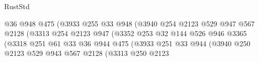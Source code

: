 \begin{lexlean}{RustStd}
\begin{coremodule}
                                            @36
                                            @948
                                            @475
                                            (@3933
                                              @255
                                              @33
                                              @948
                                              (@3940
                                                @254
                                                @2123
                                                @529
                                                @947
                                                @567
                                                @2128
                                                (@3313
                                                  @254
                                                  @2123
                                                  @947
                                                  (@3352
                                                    @253
                                                    @32
                                                    @144
                                                    @526
                                                    @946
                                                    @3365
                                                    (@3318
                                                      @251
                                                      @61
                                                      @33
                                                      @36
                                                      @944
                                                      @475
                                                      (@3933
                                                        @251
                                                        @33
                                                        @944
                                                        (@3940
                                                          @250
                                                          @2123
                                                          @529
                                                          @943
                                                          @567
                                                          @2128
                                                          (@3313
                                                            @250
                                                            @2123

\end{coremodule}
\end{lexlean}
